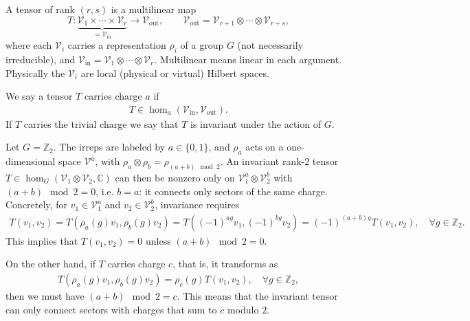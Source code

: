 \begin{definition}
A tensor of rank $(r,s)$ is a multilinear map \[
    T:\underbrace{\mathscr{V}_1\times\cdots\times \mathscr{V}_r}_{= \mathscr{V}_{\mathrm{in}}}\to \mathscr{V}_{\mathrm{out}},\qquad \mathscr{V}_{\mathrm{out}}=\mathscr{V}_{r+1}\otimes\cdots\otimes\mathscr{V}_{r+s},
\]
where each $\mathscr{V}_i$ carries a representation $\rho_i$ of a group $G$ (not necessarily irreducible), and $\mathscr{V}_{\mathrm{in}}=\mathscr{V}_1\otimes\cdots\otimes\mathscr{V}_r$. Multilinear means linear in each argument. Physically the $\mathscr{V}_i$ are local (physical or virtual) Hilbert spaces. 

We say a tensor $T$ carries charge $a$ if\begin{align}
    T\in\hom_a(\mathscr{V}_{\mathrm{in}},\mathscr{V}_{\mathrm{out}}).
\end{align}
If $T$ carries the trivial charge we say that $T$ is invariant under the action of $G$.
\end{definition}

\begin{example}
Let $G=\mathbb{Z}_2$. The irreps are labeled by $a\in\{0,1\}$, and $\rho_a$ acts on a one-dimensional space $\mathscr{V}^a$, with $\rho_a\otimes \rho_b = \rho_{(a+b)\mod 2}$. An invariant rank-2 tensor $T\in \hom_G(\mathscr{V}_1\otimes \mathscr{V}_2,\mathbb{C})$ can then be nonzero only on $\mathscr{V}_1^a\otimes \mathscr{V}_2^b$ with $(a+b)\mod 2=0$, i.e. $b=a$: it connects only sectors of the same charge. Concretely, for $v_1\in \mathscr{V}_1^{a}$ and $v_2\in \mathscr{V}_2^{b}$, invariance requires
\begin{align}
    T(v_1,v_2) = T(\rho_a(g)v_1,\rho_b(g)v_2) = T((-1)^{ag}v_1,(-1)^{bg}v_2) = (-1)^{(a+b)g}T(v_1,v_2),\quad \forall g\in \mathbb{Z}_2.
\end{align}
This implies that $T(v_1,v_2)=0$ unless $(a+b)\mod 2=0$.

On the other hand, if $T$ carries charge $c$, that is, it transforms as \begin{align}
    T(\rho_a(g)v_1,\rho_b(g)v_2) = \rho_c(g)T(v_1,v_2),\quad \forall g\in \mathbb{Z}_2,
\end{align}
then we must have $(a+b)\mod 2 = c$. This means that the invariant tensor can only connect sectors with charges that sum to $c$ modulo $2$.
\end{example}


